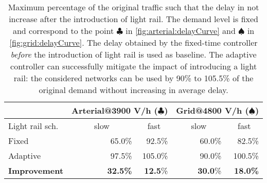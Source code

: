 \begin{table}
\footnotesize
\centering
\begin{tabular}{l|r|r|r|r}
  \multicolumn{1}{c}{}
  & \multicolumn{2}{c}{Arterial@3900 V/h ($\clubsuit$)}
  & \multicolumn{2}{c}{Grid@4800 V/h ($\spadesuit$)}
\footnotesize
\\ \hline \hline
%
Light rail sch.
  & \multicolumn{1}{c|}{~~~~~slow~~~~~}
  & \multicolumn{1}{c|}{fast}
  & \multicolumn{1}{c|}{~~~slow~~~}
  & \multicolumn{1}{c}{fast}
\\ \hline
%
Fixed        & 65.0\%  &  92.5\%  & 60.0\%  &  82.5\% \\
Adaptive    & 97.5\%  & 105.0\%  & 90.0\%  & 100.5\% \\ \hline
\textbf{Improvement}   & \textbf{32.5\%}  &  \textbf{12.5}\%  & \textbf{30.0}\%
                       &  \textbf{18.0\%}  \\
\end{tabular}
\caption{Maximum percentage of the original traffic such that the delay in not
increase after the introduction of light rail.
%
The demand level is fixed and correspond to the point
$\clubsuit$ in \cref{fig:arterial:delayCurve} and $\spadesuit$ in \cref{fig:grid:delayCurve}.
%
The delay obtained by the fixed-time controller \textit{before} the
introduction of light rail is used as baseline.
%
The adaptive controller can successfully mitigate the impact of introducing a
light rail: the considered networks can be used by 90\% to 105.5\% of the
original demand without increasing in average delay.}
%
\label{fig:table}
\end{table}

